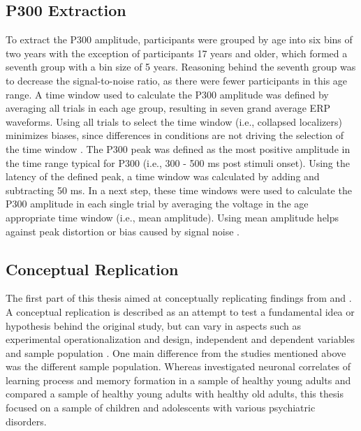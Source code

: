 \subsection{P300 Extraction}
To extract the P300 amplitude, participants were grouped by age into six bins of two years with the exception of participants 17 years and older, which formed a seventh group with a bin size of 5 years. Reasoning behind the seventh group was to decrease the signal-to-noise ratio, as there were fewer participants in this age range. A time window used to calculate the P300 amplitude was defined by averaging all trials in each age group, resulting in seven grand average ERP waveforms. Using all trials to select the time window (i.e., collapsed localizers) minimizes biases, since differences in conditions are not driving the selection of the time window \parencite{luckIntroductionEventrelatedPotential2014,luckHowGetStatistically2017}. The P300 peak was defined as the most positive amplitude in the time range typical for P300 (i.e., 300 - 500 ms post stimuli onset). Using the latency of the defined peak, a time window was calculated by adding and subtracting 50 ms. In a next step, these time windows were used to calculate the P300 amplitude in each single trial by averaging the voltage in the age appropriate time window (i.e., mean amplitude). Using mean amplitude helps against peak distortion or bias caused by signal noise \parencite{luckIntroductionEventrelatedPotential2014}.

\subsection{Conceptual Replication}
The first part of this thesis aimed at conceptually replicating findings from \textcite{steinemannTrackingNeuralCorrelates2016} and \textcite{strzelczykNeurophysiologicalMarkersSuccessful2022} . A conceptual replication is described as an attempt to test a fundamental idea or hypothesis behind the original study, but can vary in aspects such as experimental operationalization and design, independent and dependent variables and sample population \parencite{crandallScientificSuperiorityConceptual2016}. One main difference from the studies mentioned above was the different sample population. Whereas \textcite{steinemannTrackingNeuralCorrelates2016} investigated neuronal correlates of learning process and memory formation in a sample of healthy young adults and \textcite{strzelczykNeurophysiologicalMarkersSuccessful2022} compared a sample of healthy young adults with healthy old adults, this thesis focused on a sample of children and adolescents with various psychiatric disorders.

